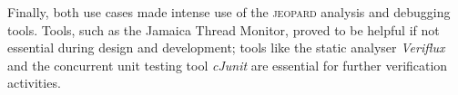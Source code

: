 \documentclass{sig-alternate}
\newcommand{\acronym}[1]{\textsc{#1}}
\begin{document}
Finally, both use cases made intense use
of the \acronym{jeopard} analysis and debugging tools.
Tools, such as the Jamaica Thread Monitor,
proved to be helpful if not essential
during design and development;
tools like the static analyser \emph{Veriflux} and
the concurrent unit testing tool \emph{cJunit} 
are essential for further verification activities.
 

%

  
\end{document}

